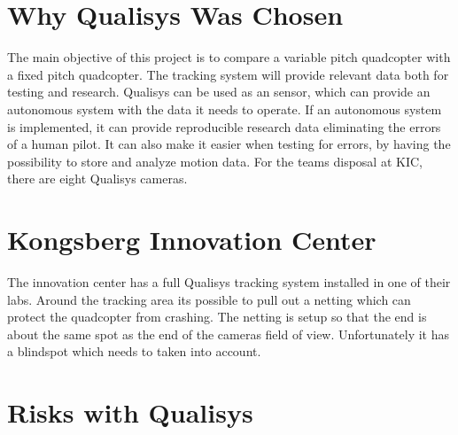 \vspace*{0.03cm}
\section*{Why Qualisys Was Chosen}

The main objective of this project is to compare a variable pitch quadcopter with a fixed pitch quadcopter. The tracking system will provide relevant data both for testing and research. Qualisys can be used as an sensor, which can provide an autonomous system with the data it needs to operate. If an autonomous system is implemented, it can provide reproducible research data eliminating the errors of a human pilot. It can also make it easier when testing for errors, by having the possibility to store and analyze motion data. For the teams disposal at KIC, there are eight Qualisys cameras. \\

\section*{Kongsberg Innovation Center}
The innovation center has a full Qualisys tracking system installed in one of their labs. Around the tracking area its possible to pull out a netting which can protect the quadcopter from crashing. The netting is setup so that the end is about the same spot as the end of the cameras field of view. Unfortunately it has a blindspot which needs to taken into account. \\

\section*{Risks with Qualisys}


